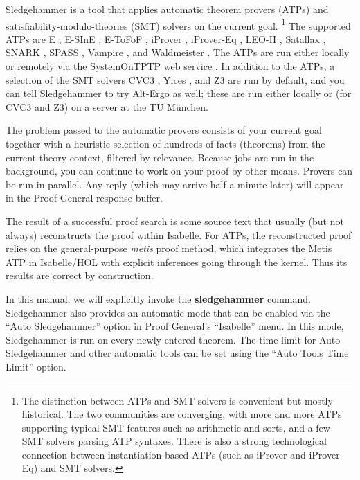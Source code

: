 \documentclass[a4paper,12pt]{article}
\begin{document}
Sledgehammer is a tool that applies automatic theorem provers (ATPs)
and satisfiability-modulo-theories (SMT) solvers on the current goal.%
\footnote{The distinction between ATPs and SMT solvers is convenient but mostly
historical. The two communities are converging, with more and more ATPs
supporting typical SMT features such as arithmetic and sorts, and a few SMT
solvers parsing ATP syntaxes. There is also a strong technological connection
between instantiation-based ATPs (such as iProver and iProver-Eq) and SMT
solvers.}
%
The supported ATPs are E \cite{schulz-2002}, E-SInE \cite{sine}, E-ToFoF
\cite{tofof}, iProver \cite{korovin-2009}, iProver-Eq
\cite{korovin-sticksel-2010}, LEO-II \cite{leo2}, Satallax \cite{satallax},
SNARK \cite{snark}, SPASS \cite{weidenbach-et-al-2009}, Vampire
\cite{riazanov-voronkov-2002}, and Waldmeister \cite{waldmeister}. The ATPs are
run either locally or remotely via the System\-On\-TPTP web service
\cite{sutcliffe-2000}. In addition to the ATPs, a selection of the SMT solvers
CVC3 \cite{cvc3}, Yices \cite{yices}, and Z3 \cite{z3} are run by default, and
you can tell Sledgehammer to try Alt-Ergo \cite{alt-ergo} as well; these are run
either locally or (for CVC3 and Z3) on a server at the TU M\"unchen.

The problem passed to the automatic provers consists of your current goal
together with a heuristic selection of hundreds of facts (theorems) from the
current theory context, filtered by relevance. Because jobs are run in the
background, you can continue to work on your proof by other means. Provers can
be run in parallel. Any reply (which may arrive half a minute later) will appear
in the Proof General response buffer.

The result of a successful proof search is some source text that usually (but
not always) reconstructs the proof within Isabelle. For ATPs, the reconstructed
proof relies on the general-purpose \textit{metis} proof method, which
integrates the Metis ATP in Isabelle/HOL with explicit inferences going through
the kernel. Thus its results are correct by construction.

In this manual, we will explicitly invoke the \textbf{sledgehammer} command.
Sledgehammer also provides an automatic mode that can be enabled via the ``Auto
Sledgehammer'' option in Proof General's ``Isabelle'' menu. In this mode,
Sledgehammer is run on every newly entered theorem. The time limit for Auto
Sledgehammer and other automatic tools can be set using the ``Auto Tools Time
Limit'' option.
\end{document}

